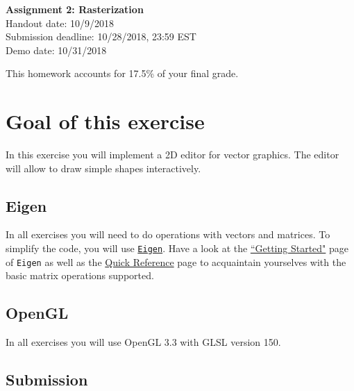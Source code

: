 \documentclass[11pt]{article}
\begin{document}
\hspace{50pt}

\begin{center}

{\Huge \textbf{Assignment 2: Rasterization}}\\
\vspace{10pt}
Handout date: 10/9/2018\\
Submission deadline: 10/28/2018,  23:59 EST\\
Demo date: 10/31/2018
\end{center}

\noindent This homework accounts for 17.5\% of your final grade. 

\section*{Goal of this exercise}
In this exercise you will implement a 2D editor for vector graphics. The editor will allow to draw simple shapes interactively.

\subsection*{Eigen}
In all exercises you will need to do operations with vectors and matrices. To simplify the code, you will use \href{http://eigen.tuxfamily.org/}{\texttt{Eigen}}. 
Have a look at the \href{http://eigen.tuxfamily.org/dox/GettingStarted.html}{``Getting Started"} page of \texttt{Eigen} as well as the \href{http://eigen.tuxfamily.org/dox/group__QuickRefPage.html}{Quick Reference} page to acquaintain yourselves with the basic matrix operations supported. 

\subsection*{OpenGL}
In all exercises you will use OpenGL 3.3 with GLSL version 150.

\subsection*{Submission}
\end{document}
